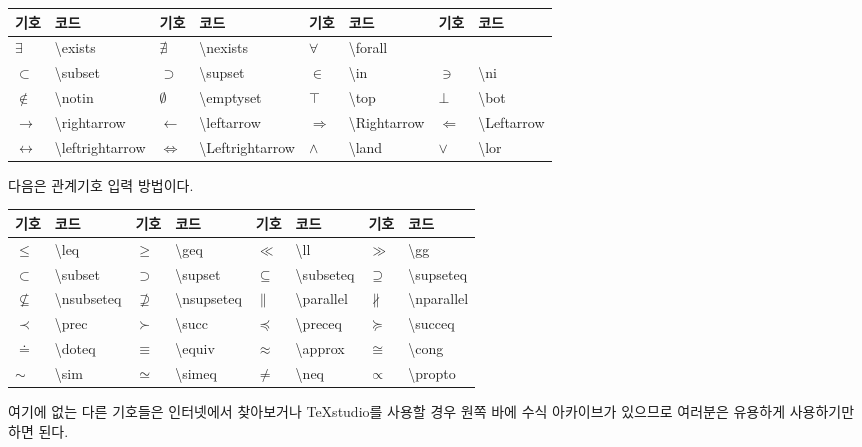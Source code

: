 \documentclass[12pt]{article}
\begin{document}
	\begin{tabularx}{\textwidth \onehalfspacing}{|l|X||l|X||l|X||l|X|}
		\hline
		기호&코드&기호&코드&기호&코드&기호&코드\\
		\hline
		\hline
		\(\exists\)&\textbackslash exists&
		\(\nexists\)&\textbackslash nexists&
		\(\forall\)&\textbackslash forall&
		&\\
		\hline
		\(\subset\)&\textbackslash subset&
		\(\supset\)&\textbackslash supset&
		\(\in\)&\textbackslash in&
		\(\ni\)&\textbackslash ni\\
		\hline
		\(\notin\)&\textbackslash notin &
		\(\emptyset \)&\textbackslash emptyset &
		\(\top\)&\textbackslash top &
		\(\bot\)&\textbackslash bot \\
		\hline
		\(\rightarrow\)&\textbackslash rightarrow &
		\(\leftarrow\)&\textbackslash leftarrow &
		\(\Rightarrow\)&\textbackslash Rightarrow &
		\(\Leftarrow\)&\textbackslash Leftarrow \\
		\hline
		\(\leftrightarrow\)&\small\textbackslash leftrightarrow &
		\(\Leftrightarrow \)&\small\textbackslash Leftrightarrow &
		\(\land\)&\textbackslash land &
		\(\lor\)&\textbackslash lor \\
		\hline
	\end{tabularx}
	\clearpage
	다음은 관계기호 입력 방법이다.\newline
	
	\begin{tabularx}{\textwidth \onehalfspacing}{|l|X||l|X||l|X||l|X|}
		\hline
		기호&코드&기호&코드&기호&코드&기호&코드\\
		\hline
		\hline
		\(\leq\)&\textbackslash leq &
		\(\geq\)&\textbackslash geq &
		\(\ll\)&\textbackslash ll &
		\(\gg\)&\textbackslash gg \\
		\hline
		\(\subset\)&\textbackslash subset &
		\(\supset\)&\textbackslash supset &
		\(\subseteq\)&\textbackslash subseteq &
		\(\supseteq\)&\textbackslash supseteq \\
		\hline
		\(\nsubseteq\)&\textbackslash nsubseteq &
		\(\nsupseteq\)&\textbackslash nsupseteq &
		\(\parallel\)&\textbackslash parallel &
		\(\nparallel\)&\textbackslash nparallel \\
		\hline
		\(\prec\)&\textbackslash prec &
		\(\succ\)&\textbackslash succ &
		\(\preceq\)&\textbackslash preceq &
		\(\succeq\)&\textbackslash succeq \\
		\hline
		\(\doteq\)&\textbackslash doteq &
		\(\equiv\)&\textbackslash equiv &
		\(\approx\)&\textbackslash approx &
		\(\cong\)&\textbackslash cong \\
		\hline
		\(\sim\)&\textbackslash sim &
		\(\simeq\)&\textbackslash simeq &
		\(\neq\)&\textbackslash neq &
		\(\propto\)&\textbackslash propto \\
		\hline
	\end{tabularx}
	\newline\newline
	여기에 없는 다른 기호들은 인터넷에서 찾아보거나 \TeX studio를 사용할 경우 원쪽 바에 수식 아카이브가 있으므로 여러분은 유용하게 사용하기만 하면 된다.
\end{document}
